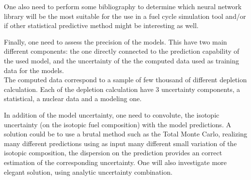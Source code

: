 \documentclass[dvips,12pt]{article}
\begin{document}
One also need to perform some bibliography to determine which neural network library will be the most suitable for the use in a fuel cycle simulation tool and/or if other statistical predictive method might be interesting as well.

Finally, one need to assess the precision of the models. This have two main different components: the one directly connected to the prediction capability of the used model, and the uncertainty of the the computed data used as training data for the models.\\
The computed data correspond to a sample of few thousand of different depletion calculation. Each of the depletion calculation have 3 uncertainty components, a statistical, a nuclear data and a modeling one. 

In addition of the model uncertainty, one need to convolute, the isotopic uncertainty (on the isotopic fuel composition) with the model predictions. 
A solution could be to use a brutal method such as the Total Monte Carlo, realizing many different predictions using as input many different  small variation of the isotopic composition, the dispersion on the prediction provides an correct estimation of the corresponding uncertainty. One will also investigate more elegant solution, using analytic uncertainty combination.



\end{document}
